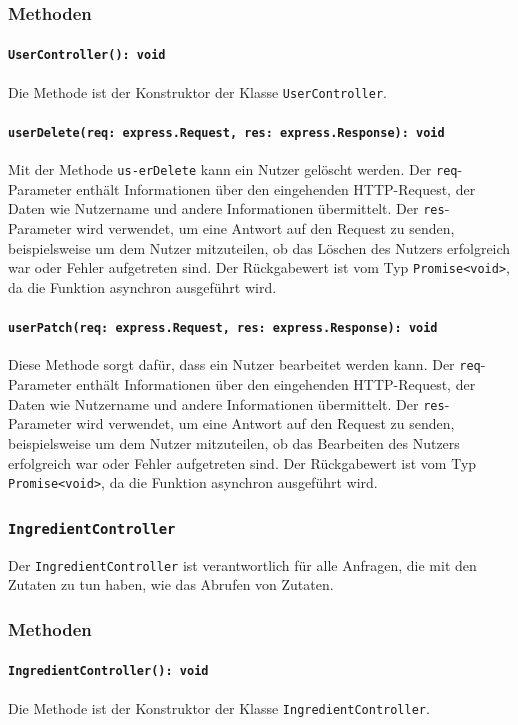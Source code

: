 \documentclass{entwurfsheft}
\begin{document}
\subsubsection*{Methoden}
\paragraph{\texttt{UserController(): void}}
Die Methode ist der Konstruktor der Klasse \texttt{UserController}.
\paragraph{\texttt{userDelete(req: express.Request, res: express.Response): void}}
Mit der Methode \texttt{us-erDelete} kann ein Nutzer gelöscht werden. Der \texttt{req}-Parameter enthält Informationen über den eingehenden HTTP-Request, der Daten wie Nutzername und andere Informationen übermittelt. Der \texttt{res}-Parameter wird verwendet, um eine Antwort auf den Request zu senden, beispielsweise um dem Nutzer mitzuteilen, ob das Löschen des Nutzers erfolgreich war oder Fehler aufgetreten sind.
Der Rückgabewert ist vom Typ \texttt{Promise<void>}, da die Funktion asynchron ausgeführt wird.
\paragraph{\texttt{userPatch(req: express.Request, res: express.Response): void}}
Diese Methode sorgt dafür, dass ein Nutzer bearbeitet werden kann. Der \texttt{req}-Parameter enthält Informationen über den eingehenden HTTP-Request, der Daten wie Nutzername und andere Informationen übermittelt. Der \texttt{res}-Parameter wird verwendet, um eine Antwort auf den Request zu senden, beispielsweise um dem Nutzer mitzuteilen, ob das Bearbeiten des Nutzers erfolgreich war oder Fehler aufgetreten sind.
Der Rückgabewert ist vom Typ \texttt{Promise<void>}, da die Funktion asynchron ausgeführt wird.

\subsubsection{\texttt{IngredientController}}\label{sec:IngredientController}
Der \texttt{IngredientController} ist verantwortlich für alle Anfragen, die mit den Zutaten zu tun haben, wie das Abrufen von Zutaten.
\subsubsection*{Methoden}
\paragraph{\texttt{IngredientController(): void}}
Die Methode ist der Konstruktor der Klasse \texttt{IngredientController}.
\end{document}
